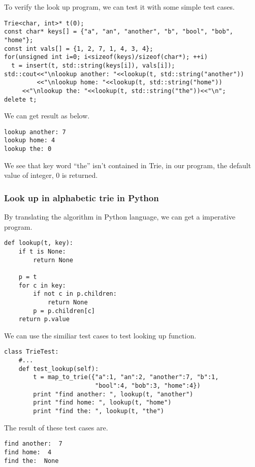 \documentclass{article}
\begin{document}
To verify the look up program, we can test it with some simple test
cases.

\begin{lstlisting}
Trie<char, int>* t(0);
const char* keys[] = {"a", "an", "another", "b", "bool", "bob", "home"};
const int vals[] = {1, 2, 7, 1, 4, 3, 4};
for(unsigned int i=0; i<sizeof(keys)/sizeof(char*); ++i)
  t = insert(t, std::string(keys[i]), vals[i]);
std::cout<<"\nlookup another: "<<lookup(t, std::string("another"))
         <<"\nlookup home: "<<lookup(t, std::string("home"))
	 <<"\nlookup the: "<<lookup(t, std::string("the"))<<"\n";
delete t;
\end{lstlisting}

We can get result as below.

\begin{verbatim}
lookup another: 7
lookup home: 4
lookup the: 0
\end{verbatim}

We see that key word ``the'' isn't contained in Trie, in our program,
the default value of integer, 0 is returned.

\subsubsection*{Look up in alphabetic trie in Python}
By translating the algorithm in Python language, we can get 
a imperative program.

\lstset{language=Python}
\begin{lstlisting}
def lookup(t, key):
    if t is None:
        return None

    p = t
    for c in key:
        if not c in p.children:
            return None
        p = p.children[c]
    return p.value
\end{lstlisting}

We can use the similiar test cases to test looking up function.

\begin{lstlisting}
class TrieTest:
    #...
    def test_lookup(self):
        t = map_to_trie({"a":1, "an":2, "another":7, "b":1, 
                         "bool":4, "bob":3, "home":4})
        print "find another: ", lookup(t, "another")
        print "find home: ", lookup(t, "home")
        print "find the: ", lookup(t, "the")
\end{lstlisting}

The result of these test cases are.

\begin{verbatim}
find another:  7
find home:  4
find the:  None
\end{verbatim}
\end{document}
